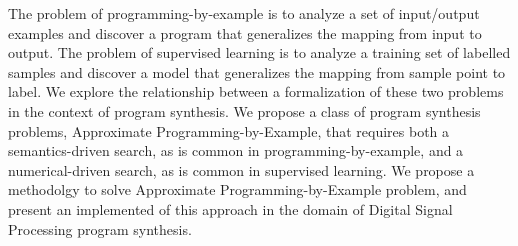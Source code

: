 The problem of programming-by-example is to analyze a set of input/output examples and discover a program that generalizes the mapping from input to output.
The problem of supervised learning is to analyze a training set of labelled samples and discover a model that generalizes the mapping from sample point to label.
We explore the relationship between a formalization of these two problems in the context of program synthesis.
We propose a class of program synthesis problems, Approximate Programming-by-Example, 
   that requires both a semantics-driven search, as is common in programming-by-example,
   and a numerical-driven search, as is common in supervised learning.
We propose a methodolgy to solve Approximate Programming-by-Example problem, 
   and present an implemented of this approach in the domain of Digital Signal Processing program synthesis.
